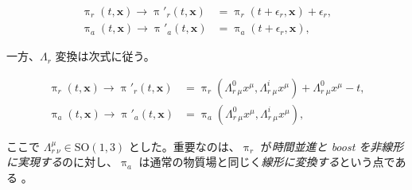 \documentclass[a4paper,11pt]{ltjsarticle}
\numberwithin{equation}{section}
\newcommand{\boldmathsymbol}[1]{{\ensuremath{\boldsymbol{#1}}}}
\newcommand{\bmx}{\boldmathsymbol{x}}
\def\bmx{{\boldsymbol{x}}}
\begin{document}
\begin{align}\label{eq:translRsym} 
    \uppi_{r}(t,\bmx) \rightarrow \uppi'_{r}(t,\bmx) &= \uppi_{r}(t+\epsilon_{r},\bmx) + \epsilon_{r},\\
    \uppi_{a}(t,\bmx) \rightarrow \uppi'_{a}(t,\bmx) &= \uppi_{a}(t+\epsilon_{r},\bmx),
\end{align}

一方、$\Lambda_r$ 変換は次式に従う。

\begin{align}\label{eq:LorentzRsym}
\uppi_{r}(t,\bmx) \rightarrow \uppi'_{r}(t,\bmx) &= \uppi_{r}\left(\Lambda^0_{r~\mu}x^\mu,\Lambda^i_{r~\mu}x^\mu \right)+\Lambda^0_{r~\mu}x^\mu - t, \\
\uppi_{a}(t,\bmx) \rightarrow \uppi'_{a}(t,\bmx) &= \uppi_{a}\left(\Lambda^0_{r~\mu}x^\mu,\Lambda^i_{r~\mu}x^\mu \right),
\end{align}

ここで $\Lambda^\mu_{r~\nu}\in\mathrm{SO}(1,3)$ とした。重要なのは、$\uppi_r$ が\textit{時間並進と boost を非線形に実現する}のに対し、$\uppi_a$ は通常の物質場と同じく\textit{線形に変換する}という点である \cite{Hongo:2018ant}。
\end{document}
